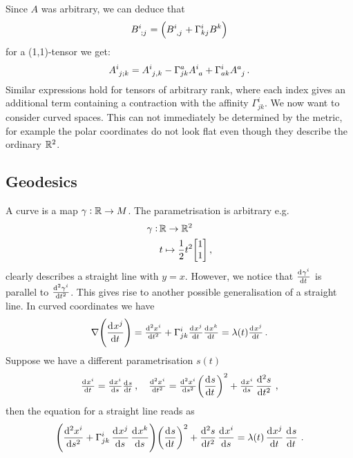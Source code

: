 Since $A$ was arbitrary, we can deduce that
\begin{equation}
\tensor{B}{^i_;_j}=\left(\tensor{B}{^i_{,j}}+\Gamma^i_{kj}\tensor{B}{^k}\right)
\end{equation}
for a (1,1)-tensor we get:
\begin{equation}
\tensor{A}{^i_j_;_k}=\tensor{A}{^i_j_{,k}}-\Gamma^a_{jk}\tensor{A}{^i_a}+\Gamma^i_{ak}\tensor{A}{^a_j}\,
.\end{equation}
Similar expressions hold for tensors of arbitrary rank, where each index gives
an additional term containing a contraction with the affinity $\Gamma^i_{jk}$. 
We now want to consider curved spaces. This can not immediately be determined by
the metric, for example the polar coordinates do not look flat even though they
describe the ordinary $\mathbb{R}^2$.
\subsection{Geodesics}
A curve is a map $\gamma:\mathbb{R}\to M$. The parametrisation is arbitrary e.g.
\begin{equation}
\begin{split}
\gamma:\, &\Reals\to \Reals^2\\
& t\mapsto
\frac{1}{2} t^2
\begin{bmatrix}
1 \\
1
\end{bmatrix}\, ,
\end{split}
\end{equation}
clearly describes a straight line with $y=x$.
However, we notice that $\od{\tensor{\gamma}{^i}}{t}$ is parallel to
$\od[2]{\tensor{\gamma}{^i}}{t}$. This gives rise to another possible
generalisation of a straight line.
In curved coordinates we have 
\begin{equation}
\nabla \left( \dod{\tensor{x}{^j}}{t} \right)  = 
\od[2]{\tensor{x}{^i}}{t}+\affin{i}{j}{k}\od{\tensor{x}{^j}}{t}\od{\tensor{x}{^k}}{t}
=\lambda(t)\od{\tensor{x}{^j}}{t}\,.
\end{equation}
Suppose we have a different parametrisation $s(t)$
\begin{equation}
\od{\tensor{x}{^i}}{t}=\od{\tensor{x}{^i}}{s}\od{s}{t}\,,\quad
\od[2]{\tensor{x}{^i}}{t}=\od[2]{\tensor{x}{^i}}{s}\left(\dod{s}{t}\right)^2
+\od{\tensor{x}{^i}}{s}\dod[2]{s}{t}\, ,
\end{equation} 
then the equation for a straight line reads as
\begin{equation}
\left(\dod[2]{\tensor{x}{^i}}{s}+\affin{i}{j}{k}\dod{\tensor{x}{^j}}{s}\dod{\tensor{x}{^k}}{s}
\right)\left(\dod{s}{t}\right)^2+\dod[2]{s}{t}\dod{\tensor{x}{^i}}{s}
=\lambda(t)\dod{\tensor{x}{^j}}{t}\dod{s}{t}\,.
\end{equation}
